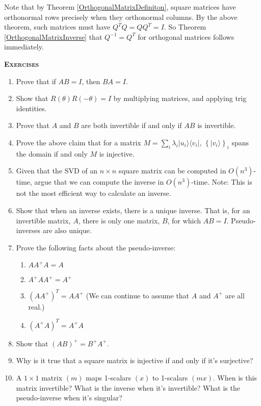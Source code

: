 \documentclass{amsbook}
\begin{document}
Note that by Theorem \ref{OrthogonalMatrixDefiniton}, square matrices have orthonormal rows precisely when they orthonormal columns.  By the above theorem, such matrices must have $Q^TQ=QQ^T=I$.  So Theorem \ref{OrthogonalMatrixInverse} that $Q^{-1}=Q^T$ for orthogonal matrices follows immediately.

{\bfseries\scshape\Large Exercises}

\begin{enumerate}
\item Prove that if $AB=I$, then $BA=I$.
\item Show that $R(\theta)R(-\theta)=I$ by multiplying matrices, and applying trig identities.
\item Prove that $A$ and $B$ are both invertible if and only if $AB$ is invertible.
\item Prove the above claim that for a matrix $M=\sum_i\lambda_i|u_i\rangle\langle v_i|$, $\left\{|v_i\rangle\right\}_i$ spans the domain if and only $M$ is injective.
\item Given that the SVD of an $n\times n$ square matrix can be computed in $O(n^3)$-time, argue that we can compute the inverse in $O(n^3)$-time.  Note: This is not the most efficient way to calculate an inverse.
\item Show that when an inverse exists, there is a unique inverse.  That is, for an invertible matrix, $A$, there is only one matrix, $B$, for which $AB=I$.  Pseudo-inverses are also unique.
\item Prove the following facts about the pseudo-inverse:
\begin{enumerate}[a]
  \item $AA^+A=A$
  \item $A^+AA^+=A^+$
  \item $\left(AA^+\right)^T=AA^+$  (We can continue to assume that $A$ and $A^+$ are all real.)
  \item $\left(A^+A\right)^T=A^+A$
\end{enumerate}
\item Show that $\left(AB\right)^+=B^+A^+$.
\item Why is it true that a square matrix is injective if and only if it's surjective?
\item A $1\times1$ matrix $(m)$ maps 1-scalars $(x)$ to 1-scalars $(mx)$.  When is this matrix invertible?  What is the inverse when it's invertible?  What is the pseudo-inverse when it's singular?
\end{enumerate}
\end{document}
